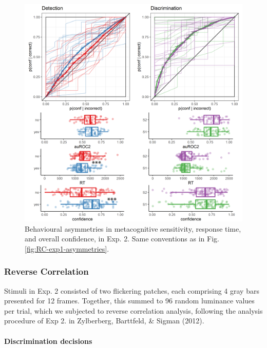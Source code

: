 \documentclass[12pt,twoside]{reedthesis}
\begin{document}
\begin{figure}
\includegraphics[width=\textwidth]{figure/RC/RC-exp2-asymmetries-enhanced} \caption[Behavioural asymmetries in metacognitive sensitivity, response time, and overall confidence, in Exp. 2]{Behavioural asymmetries in metacognitive sensitivity, response time, and overall confidence, in Exp. 2. Same conventions as in Fig. \ref{fig:RC-exp1-asymmetries}.}\label{fig:RC-exp2-asymmetries}
\end{figure}
\hypertarget{reverse-correlation-1}{%
\subsubsection{Reverse Correlation}\label{reverse-correlation-1}}

Stimuli in Exp. 2 consisted of two flickering patches, each comprising 4 gray bars presented for 12 frames. Together, this summed to 96 random luminance values per trial, which we subjected to reverse correlation analysis, following the analysis procedure of Exp 2. in Zylberberg, Barttfeld, \& Sigman (2012).

\hypertarget{discrimination-decisions}{%
\paragraph*{Discrimination decisions}\label{discrimination-decisions}}
\end{document}
